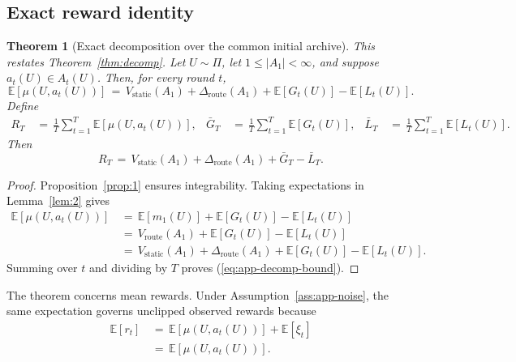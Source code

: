 \documentclass{article} %
\newtheorem{theorem}{Theorem}
\renewcommand{\eqref}[1]{\textup{(\ref{#1})}}
\begin{document}
\subsection{Exact reward identity}

\begin{theorem}[Exact decomposition over the common initial archive]
\label{thm:main}
This restates Theorem~\ref{thm:decomp}.  Let \(U\sim\Pi\), let
\(1\leq |A_1|<\infty\), and suppose \(a_t(U)\in A_t(U)\).  Then, for every
round \(t\),
\begin{equation}
\mathbb{E}[\mu(U,a_t(U))]
\,=\,
V_{\mathrm{static}}(A_1)
+
\Delta_{\mathrm{route}}(A_1)
+
\mathbb{E}[G_t(U)]
-
\mathbb{E}[L_t(U)].
\end{equation}
Define
\begin{equation}
\begin{aligned}
R_T
&\,=\,\frac1T\sum_{t=1}^T\mathbb E[\mu(U,a_t(U))], &
\bar G_T
&\,=\,\frac1T\sum_{t=1}^T\mathbb E[G_t(U)], &
\bar L_T
&\,=\,\frac1T\sum_{t=1}^T\mathbb E[L_t(U)].
\end{aligned}
\end{equation}
Then
\begin{equation}
\label{eq:app-decomp-bound}
R_T
\,=\,
V_{\mathrm{static}}(A_1)
+
\Delta_{\mathrm{route}}(A_1)
+
\bar G_T
-
\bar L_T.
\end{equation}
\end{theorem}

\begin{proof}
Proposition~\ref{prop:1} ensures integrability.  Taking expectations in
Lemma~\ref{lem:2} gives
\begin{equation}
\begin{aligned}
\mathbb{E}[\mu(U,a_t(U))]
&\,=\,
  \mathbb E[m_1(U)]+\mathbb E[G_t(U)]-\mathbb E[L_t(U)] \\
&\,=\,
  V_{\mathrm{route}}(A_1)+\mathbb E[G_t(U)]-\mathbb E[L_t(U)] \\
&\,=\,
V_{\mathrm{static}}(A_1)
+
\Delta_{\mathrm{route}}(A_1)
+
\mathbb E[G_t(U)]
-
\mathbb E[L_t(U)].
\end{aligned}
\end{equation}
Summing over \(t\) and dividing by \(T\) proves
\eqref{eq:app-decomp-bound}.
\end{proof}

The theorem concerns mean rewards.  Under Assumption~\ref{ass:app-noise}, the
same expectation governs unclipped observed rewards because
\begin{equation}
\label{eq:app-observed-mean-link}
\begin{aligned}
\mathbb{E}[r_t]
&\,=\,\mathbb E[\mu(U,a_t(U))]+\mathbb E[\xi_t] \\
&\,=\,
\mathbb{E}[\mu(U,a_t(U))].
\end{aligned}
\end{equation}
\end{document}
